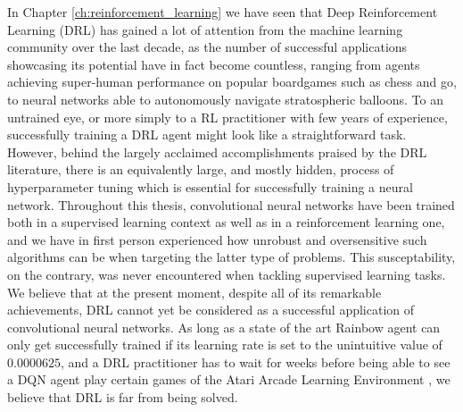 In Chapter \ref{ch:reinforcement_learning} we have seen that Deep Reinforcement Learning (DRL) has gained a lot of attention from the machine learning community over the last decade, as the number of successful applications showcasing its potential have in fact become countless, ranging from agents achieving super-human performance on popular boardgames such as chess and go, to neural networks able to autonomously navigate stratospheric balloons. To an untrained eye, or more simply to a RL practitioner with few years of experience, successfully training a DRL agent might look like a straightforward task. However, behind the largely acclaimed accomplishments praised by the DRL literature, there is an equivalently large, and mostly hidden, process of hyperparameter tuning which is essential for successfully training a neural network. Throughout this thesis, convolutional neural networks have been trained both in a supervised learning context as well as in a reinforcement learning one, and we have in first person experienced how unrobust and oversensitive such algorithms can be when targeting the latter type of problems. This susceptability, on the contrary, was never encountered when tackling supervised learning tasks. We believe that at the present moment, despite all of its remarkable achievements, DRL cannot yet be considered as a successful application of convolutional neural networks. As long as a state of the art Rainbow agent \cite{hessel2018rainbow} can only get successfully trained if its learning rate is set to the unintuitive value of $0.0000625$, and a DRL practitioner has to wait for weeks before being able to see a DQN agent play certain games of the Atari Arcade Learning Environment \cite{kaiser2019model}, we believe that DRL is far from being solved.


